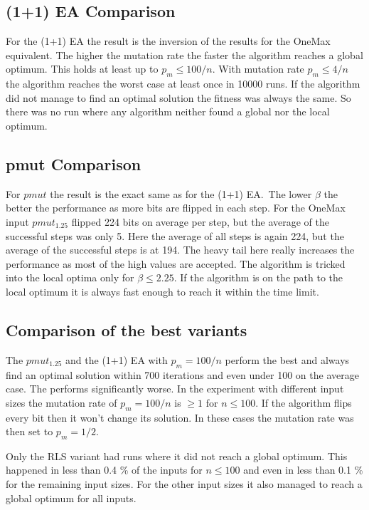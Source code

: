 \subsection{(1+1) EA Comparison}


For the (1+1) EA the result is the inversion of the results for the OneMax equivalent.
The higher the mutation rate the faster the algorithm reaches a global optimum.
This holds at least up to $p_m\le100/n$.
With mutation rate $p_m\le4/n$ the algorithm reaches the worst case at least once in 10000 runs.
If the algorithm did not manage to find an optimal solution the fitness was always the same.
So there was no run where any algorithm neither found a global nor the local optimum.
\subsection{pmut Comparison}


For $pmut$ the result is the exact same as for the (1+1) EA.\ 
The lower $\beta$ the better the performance as more bits are flipped in each step.
For the OneMax input $pmut_{1.25}$ flipped 224 bits on average per step, but the average of the successful steps was only 5.
Here the average of all steps is again 224, but the average of the successful steps is at 194.
The heavy tail here really increases the performance as most of the high values are accepted.
The algorithm is tricked into the local optima only for $\beta\le2.25$.
If the algorithm is on the path to the local optimum it is always fast enough to reach it within the time limit.
\subsection{Comparison of the best variants}
% 
% 
The $pmut_{1.25}$ and the (1+1) EA with $p_m=100/n$ perform the best and always find an optimal solution within 700 iterations and even under 100 on the average case.
The \RLSN[4] performs significantly worse.
In the experiment with different input sizes the mutation rate of $p_m=100/n$ is $\ge1$ for $n\le100$.
If the algorithm flips every bit then it won't change its solution.
In these cases the mutation rate was then set to $p_m=1/2$.



Only the RLS variant had runs where it did not reach a global optimum.
This happened in less than 0.4 \% of the inputs for $n\le100$ and even in less than 0.1 \% for the remaining input sizes.
For the other input sizes it also managed to reach a global optimum for all inputs.

